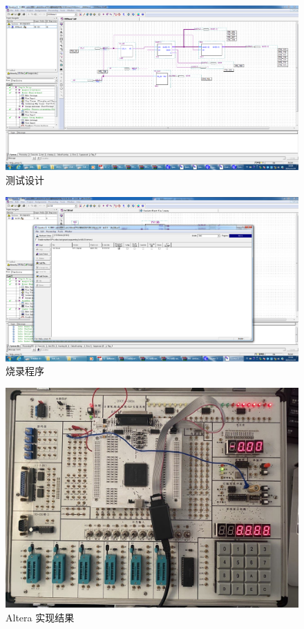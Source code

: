 \documentclass[11pt]{SEU-Digital-Report}
\begin{document}
      \begin{figure}[htbp]
        \includegraphics[width=\linewidth]{fig/Altera/12.PNG}
        \caption{测试设计}
        \label{fig:Altera_12}
      \end{figure}

      \begin{figure}[htbp]
        \includegraphics[width=\linewidth]{fig/Altera/9.PNG}
        \caption{烧录程序}
        \label{fig:Altera_9}
      \end{figure}

      \begin{figure}[htbp]
        \centering
        \includegraphics[width=.8\linewidth]{fig/Altera/result.jpg}
        \caption{Altera 实现结果}
        \label{fig:Altera_result}
      \end{figure}
    
\end{document}
